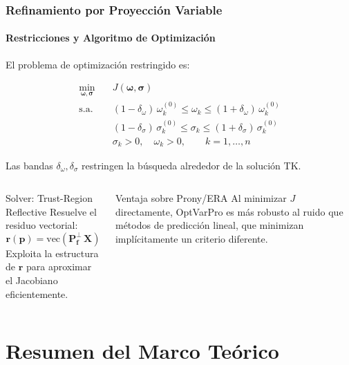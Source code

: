 \documentclass{beamer}
\begin{document}
\begin{frame}
\frametitle{Refinamiento por Proyección Variable}
\framesubtitle{Restricciones y Algoritmo de Optimización}

El problema de optimización restringido es:

\begin{equation}
    \begin{aligned}
        \min_{\bm{\omega},\bm{\sigma}}\quad & J(\bm{\omega},\bm{\sigma}) \\
        \text{s.a.}\quad
        & (1-\delta_\omega)\,\omega_k^{(0)} \leq \omega_k \leq (1+\delta_\omega)\,\omega_k^{(0)} \\
        & (1-\delta_\sigma)\,\sigma_k^{(0)} \leq \sigma_k \leq (1+\delta_\sigma)\,\sigma_k^{(0)} \\
        & \sigma_k > 0,\quad \omega_k > 0, \qquad k = 1,\ldots,n
    \end{aligned}
    \label{eq:opt_problem}
\end{equation}

Las bandas $\delta_\omega, \delta_\sigma$ restringen la búsqueda alrededor de la solución TK.

\vspace{0.4em}
\begin{columns}
\begin{block}{Solver: Trust-Region Reflective}
    Resuelve el residuo vectorial:
    \begin{equation}
        \mathbf{r}(\mathbf{p}) = \mathrm{vec}\!\left(\mathbf{P}_{\mathbf{f}}^\perp\,\mathbf{X}\right)
    \end{equation}
    Exploita la estructura de $\mathbf{r}$ para aproximar el Jacobiano eficientemente.
\end{block}

\begin{exampleblock}{Ventaja sobre Prony/ERA}
    Al minimizar $J$ directamente, OptVarPro es más robusto al ruido que métodos de predicción lineal, que minimizan implícitamente un criterio diferente.
\end{exampleblock}
\end{columns}

\end{frame}

\section{Resumen del Marco Teórico}
\end{document}
